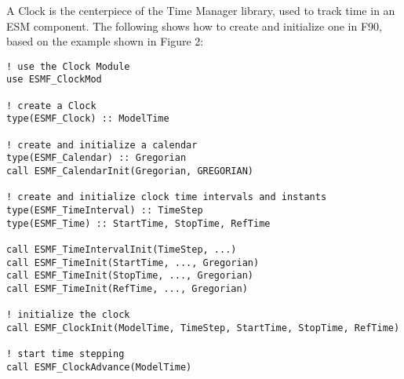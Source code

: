 
A Clock is the centerpiece of the Time Manager library, used to track time
in an ESM component.  The following shows how to create and initialize one
in F90, based on the example shown in Figure 2:

\begin{verbatim}
! use the Clock Module
use ESMF_ClockMod

! create a Clock
type(ESMF_Clock) :: ModelTime

! create and initialize a calendar
type(ESMF_Calendar) :: Gregorian
call ESMF_CalendarInit(Gregorian, GREGORIAN)

! create and initialize clock time intervals and instants
type(ESMF_TimeInterval) :: TimeStep
type(ESMF_Time) :: StartTime, StopTime, RefTime

call ESMF_TimeIntervalInit(TimeStep, ...)
call ESMF_TimeInit(StartTime, ..., Gregorian)
call ESMF_TimeInit(StopTime, ..., Gregorian)
call ESMF_TimeInit(RefTime, ..., Gregorian)

! initialize the clock
call ESMF_ClockInit(ModelTime, TimeStep, StartTime, StopTime, RefTime)

! start time stepping
call ESMF_ClockAdvance(ModelTime)
\end{verbatim}
